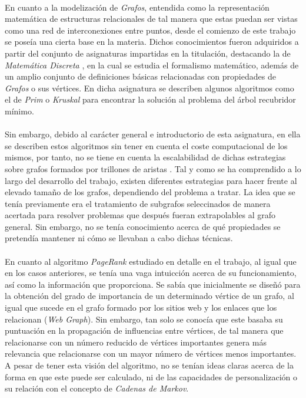 \documentclass{subfiles}
\begin{document}
      \paragraph{}
      En cuanto a la modelización de \emph{Grafos}, entendida como la representación matemática de estructuras relacionales de tal manera que estas puedan ser vistas como una red de interconexiones entre puntos, desde el comienzo de este trabajo se poseía una cierta base en la materia. Dichos conocimientos fueron adquiridos a partir del conjunto de asignaturas impartidas en la titulación, destacando la de \emph{Matemática Discreta} \cite{matematicaDiscreta2016notes}, en la cual se estudia el formalismo matemático, además de un amplio conjunto de definiciones básicas relacionadas con propiedades de \emph{Grafos} o sus vértices. En dicha asignatura se describen algunos algoritmos como el de \emph{Prim} o \emph{Kruskal} para encontrar la solución al problema del árbol recubridor mínimo.

      \paragraph{}
      Sin embargo, debido al carácter general e introductorio de esta asignatura, en ella se describen estos algoritmos sin tener en cuenta el coste computacional de los mismos, por tanto, no se tiene en cuenta la escalabilidad de dichas estrategias sobre grafos formados por trillones de aristas \cite{ching2015one}. Tal y como se ha comprendido a lo largo del desarrollo del trabajo, existen diferentes estrategias para hacer frente al elevado tamaño de los grafos, dependiendo del problema a tratar. La idea que se tenía previamente era el tratamiento de subgrafos seleccinados de manera acertada para resolver problemas que después fueran extrapolables al grafo general. Sin embargo, no se tenía conocimiento acerca de qué propiedades se pretendía mantener ni cómo se llevaban a cabo dichas técnicas.

      \paragraph{}
      En cuanto al algoritmo \emph{PageRank} estudiado en detalle en el trabajo, al igual que en los casos anteriores, se tenía una vaga intuicción acerca de su funcionamiento, así como la información que proporciona. Se sabía que inicialmente se diseñó para la obtención del grado de importancia de un determinado vértice de un grafo, al igual que sucede en el grafo formado por los sitios web y los enlaces que los relacionan (\emph{Web Graph}). Sin embargo, tan solo se conocía que este basaba su puntuación en la propagación de influencias entre vértices, de tal manera que relacionarse con un número reducido de vértices importantes genera más relevancia que relacionarse con un mayor número de vértices menos importantes. A pesar de tener esta visión del algoritmo, no se tenían ideas claras acerca de la forma en que este puede ser calculado, ni de las capacidades de personalización o su relación con el concepto de \emph{Cadenas de Markov}.
\end{document}
